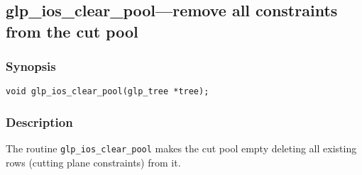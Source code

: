 \newpage

\subsection{glp\_ios\_clear\_pool---remove all constraints from the cut
pool}

\subsubsection*{Synopsis}

\begin{verbatim}
void glp_ios_clear_pool(glp_tree *tree);
\end{verbatim}

\subsubsection*{Description}

The routine \verb|glp_ios_clear_pool| makes the cut pool empty deleting
all existing rows (cutting plane constraints) from it.

